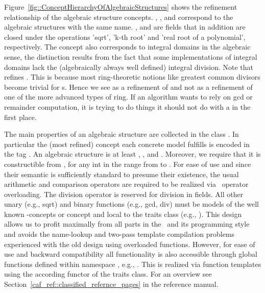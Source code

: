 Figure~\ref{fig::ConceptHierarchyOfAlgebraicStructures} shows the refinement 
relationship of the algebraic structure concepts. 
, ,   and 
 correspond to the algebraic structures with the
same name. ,  and 
 are fields that in addition are closed under 
the operations 'sqrt', 'k-th root' and 'real root of a polynomial', 
respectively. The concept  also
corresponds to integral domains in the algebraic sense, the
distinction results from the fact that some implementations of
integral domains lack the (algebraically always well defined) integral 
division.
Note that  refines . This is because 
most ring-theoretic notions like greatest common divisors become trivial for 
s. Hence we see  as a refinement of 
 and not as a 
refinement of one of the more advanced types of ring. 
If an algorithm wants to rely on gcd or remainder computation, it is trying 
to do things it should not do with a  in the first place. 


The main properties of an algebraic structure are collected in the class   
. 
In particular the (most refined) concept each concrete model  
fulfills is encoded in the tag 
.
An algebraic structure is at least , 
,  and 
. Moreover, we require that it is
constructible from , for any int in the range from  to . 
For ease of use and since their semantic is sufficiently standard to presume 
their existence, the usual arithmetic and comparison operators are required
to be realized via \CC\ operator overloading. 
The division operator is reserved for division in fields.  
All other unary (e.g., sqrt) and binary functions 
(e.g., gcd, div) must be models of the well known \stl-concepts
 or 
concept and local to the traits class 
(e.g., ). 
This design allows us to profit maximally from all parts in the 
\stl\ and its programming style and avoids the name-lookup and 
two-pass template compilation problems experienced with the old design 
using overloaded functions. However, for ease of use and backward 
compatibility all functionality is also 
accessible through global functions defined within namespace , 
e.g., . This is realized via function templates using 
the according functor of the traits class. For an overview see 
Section~\ref{caf_ref::classified_refernce_pages} in the reference manual.

